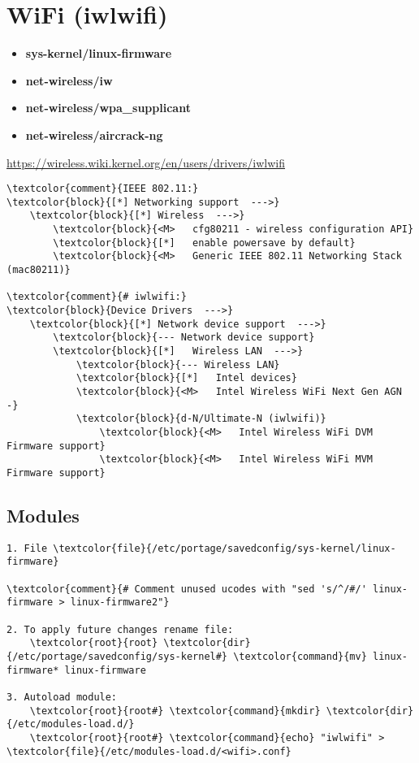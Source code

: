 \documentclass[10pt, a4paper, onecolumn, openany]{book}         %
\begin{document}
\section{WiFi (iwlwifi)}
\begin{itemize}
    \item \textbf{sys-kernel/linux-firmware}
    \item \textbf{net-wireless/iw}
    \item \textbf{net-wireless/wpa\_supplicant}
    \item \textbf{net-wireless/aircrack-ng}
\end{itemize}
\underline{\url{https://wireless.wiki.kernel.org/en/users/drivers/iwlwifi}}
\begin{Verbatim}[commandchars=\\\{\}]
\textcolor{comment}{IEEE 802.11:}
\textcolor{block}{[*] Networking support  --->}
    \textcolor{block}{[*] Wireless  --->}
        \textcolor{block}{<M>   cfg80211 - wireless configuration API}
        \textcolor{block}{[*]   enable powersave by default}
        \textcolor{block}{<M>   Generic IEEE 802.11 Networking Stack (mac80211)}

\textcolor{comment}{# iwlwifi:}
\textcolor{block}{Device Drivers  --->}
    \textcolor{block}{[*] Network device support  --->}
        \textcolor{block}{--- Network device support}
        \textcolor{block}{[*]   Wireless LAN  --->}
            \textcolor{block}{--- Wireless LAN}
            \textcolor{block}{[*]   Intel devices}
            \textcolor{block}{<M>   Intel Wireless WiFi Next Gen AGN -}
            \textcolor{block}{d-N/Ultimate-N (iwlwifi)}
                \textcolor{block}{<M>   Intel Wireless WiFi DVM Firmware support}
                \textcolor{block}{<M>   Intel Wireless WiFi MVM Firmware support}
\end{Verbatim}
\subsection{Modules}
\begin{Verbatim}[commandchars=\\\{\}]
1. File \textcolor{file}{/etc/portage/savedconfig/sys-kernel/linux-firmware}

\textcolor{comment}{# Comment unused ucodes with "sed 's/^/#/' linux-firmware > linux-firmware2"}

2. To apply future changes rename file:
    \textcolor{root}{root} \textcolor{dir}{/etc/portage/savedconfig/sys-kernel#} \textcolor{command}{mv} linux-firmware* linux-firmware 
    
3. Autoload module:
    \textcolor{root}{root#} \textcolor{command}{mkdir} \textcolor{dir}{/etc/modules-load.d/}
    \textcolor{root}{root#} \textcolor{command}{echo} "iwlwifi" > \textcolor{file}{/etc/modules-load.d/<wifi>.conf}
\end{Verbatim}
\end{document}
